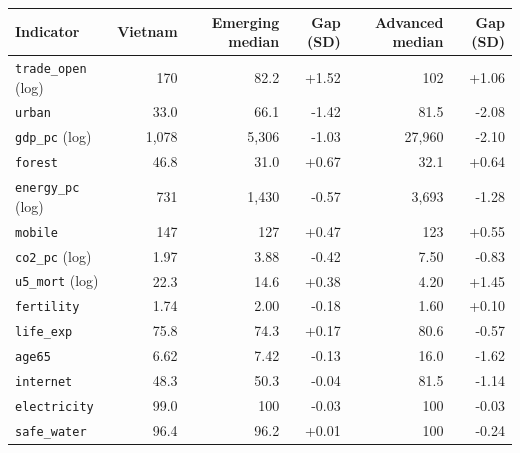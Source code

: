 \footnotesize
\begin{tabular}{lrrrrr}
\toprule
Indicator & Vietnam & Emerging median & Gap (SD) & Advanced median & Gap (SD) \\
\midrule
\texttt{trade\_open} (log) & 170 & 82.2 & +1.52 & 102 & +1.06 \\
\texttt{urban} & 33.0 & 66.1 & -1.42 & 81.5 & -2.08 \\
\texttt{gdp\_pc} (log) & 1,078 & 5,306 & -1.03 & 27,960 & -2.10 \\
\texttt{forest} & 46.8 & 31.0 & +0.67 & 32.1 & +0.64 \\
\texttt{energy\_pc} (log) & 731 & 1,430 & -0.57 & 3,693 & -1.28 \\
\texttt{mobile} & 147 & 127 & +0.47 & 123 & +0.55 \\
\texttt{co2\_pc} (log) & 1.97 & 3.88 & -0.42 & 7.50 & -0.83 \\
\texttt{u5\_mort} (log) & 22.3 & 14.6 & +0.38 & 4.20 & +1.45 \\
\texttt{fertility} & 1.74 & 2.00 & -0.18 & 1.60 & +0.10 \\
\texttt{life\_exp} & 75.8 & 74.3 & +0.17 & 80.6 & -0.57 \\
\texttt{age65} & 6.62 & 7.42 & -0.13 & 16.0 & -1.62 \\
\texttt{internet} & 48.3 & 50.3 & -0.04 & 81.5 & -1.14 \\
\texttt{electricity} & 99.0 & 100 & -0.03 & 100 & -0.03 \\
\texttt{safe\_water} & 96.4 & 96.2 & +0.01 & 100 & -0.24 \\
\bottomrule
\end{tabular}
